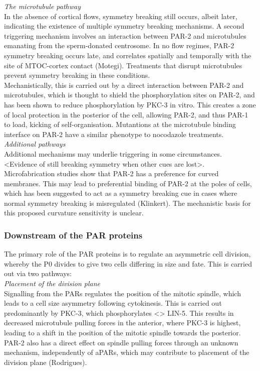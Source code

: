 \documentclass[12pt]{"article"}
\begin{document}
\textit{The microtubule pathway}\\

In the absence of cortical flows, symmetry breaking still occurs, albeit later, indicating the existence of multiple symmetry breaking mechanisms. A second triggering mechanism involves an interaction between PAR-2 and microtubules emanating from the sperm-donated centrosome. In no flow regimes, PAR-2 symmetry breaking occurs late, and correlates spatially and temporally with the site of MTOC-cortex contact (Motegi). Treatments that disrupt microtubules prevent symmetry breaking in these conditions.\\

Mechanistically, this is carried out by a direct interaction between PAR-2 and microtubules, which is thought to shield the phosphorylation sites on PAR-2, and has been shown to reduce phosphorylation by PKC-3 in vitro. This creates a zone of local protection in the posterior of the cell, allowing PAR-2, and thus PAR-1 to load, kicking of self-organisation. Mutantions at the microtubule binding interface on PAR-2 have a similar phenotype to nocodazole treatments.\\

\textit{Additional pathways}\\

Additional mechanisms may underlie triggering in some circumstances. <Evidence of still breaking symmetry when other cues are lost>. Microfabrication studies show that PAR-2 has a preference for curved membranes. This may lead to preferential binding of PAR-2 at the poles of cells, which has been suggested to act as a symmetry breaking cue in cases where normal symmetry breaking is misregulated (Klinkert). The mechanistic basis for this proposed curvature sensitivity is unclear.\\


\subsubsection{Downstream of the PAR proteins}

The primary role of the PAR proteins is to regulate an asymmetric cell division, whereby the P0 divides to give two cells differing in size and fate. This is carried out via two pathways:\\

\textit{Placement of the division plane}\\

Signalling from the PARs regulates the position of the mitotic spindle, which leads to a cell size asymmetry following cytokinesis. This is carried out predominantly by PKC-3, which phosphorylates <> LIN-5. This results in decreased microtubule pulling forces in the anterior, where PKC-3 is highest, leading to a shift in the position of the mitotic spindle towards the posterior. PAR-2 also has a direct effect on spindle pulling forces through an unknown mechanism, independently of aPARs, which may contribute to placement of the division plane (Rodrigues).\\
\end{document}
